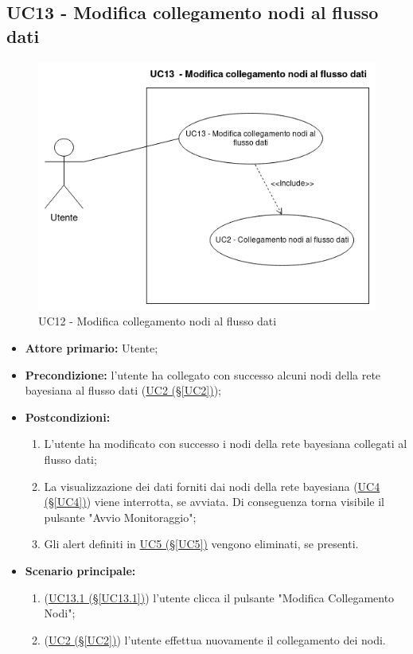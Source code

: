 \pagebreak

\subsection{UC13 - Modifica collegamento nodi al flusso dati}\label{UC13}

\begin{figure}[H]
\centering
\includegraphics[scale=0.6]{./images/UC13.png}
\caption{UC12 - Modifica collegamento nodi al flusso dati}
\end{figure}


\begin{itemize}
\item \textbf{Attore primario:} Utente;
\item \textbf{Precondizione:} l'utente ha collegato con successo alcuni nodi della rete bayesiana al flusso dati (\hyperref[UC2]{UC2 (§\ref*{UC2})});
\item \textbf{Postcondizioni:} 
	\begin{enumerate}
	\item L'utente ha modificato con successo i nodi della rete bayesiana collegati al flusso dati;
	\item La visualizzazione dei dati forniti dai nodi della rete bayesiana (\hyperref[UC4]{UC4 (§\ref*{UC4})}) viene interrotta, se avviata. Di conseguenza torna visibile il pulsante "Avvio Monitoraggio";
	\item Gli alert definiti in \hyperref[UC5]{UC5 (§\ref*{UC5})} vengono eliminati, se presenti.
	\end{enumerate}
\item \textbf{Scenario principale:}
	\begin{enumerate}
	\item (\hyperref[UC13.1]{UC13.1 (§\ref*{UC13.1})}) l'utente clicca il pulsante "Modifica Collegamento Nodi";
	\item (\hyperref[UC2]{UC2 (§\ref*{UC2})}) l'utente effettua nuovamente il collegamento dei nodi.
	\end{enumerate}
\end{itemize}

